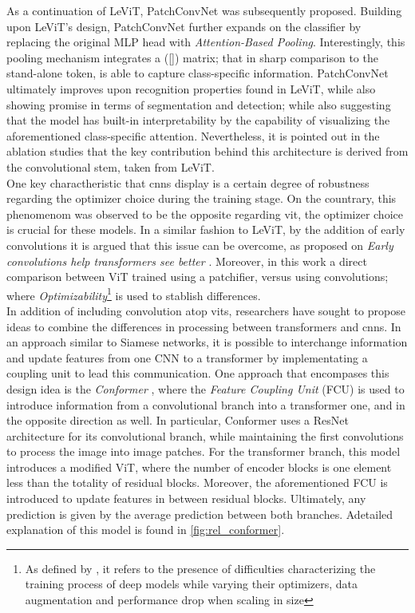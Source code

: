 As a continuation of LeViT, PatchConvNet \autocite{touvron2021augmenting} was subsequently 
proposed. Building upon LeViT's design, PatchConvNet further expands on the classifier by 
replacing the original MLP head with \emph{Attention-Based Pooling}. Interestingly, this 
pooling mechanism integrates a ([]) matrix; that in sharp comparison to the stand-alone 
token, is able to capture class-specific information. PatchConvNet ultimately improves upon 
recognition properties found in LeViT, while also showing promise in terms of segmentation and 
detection; while also suggesting that the model has built-in interpretability by the capability of 
visualizing the aforementioned class-specific attention. Nevertheless, it is pointed out in the 
ablation studies that the key contribution behind this architecture is derived from the 
convolutional stem, taken from LeViT.\\ 

\noindent One key charactheristic that \glspl{cnn} display is a certain degree of robustness 
regarding the optimizer choice during the training stage. On the countrary, this phenomenom was 
observed to be the opposite regarding \gls{vit}, the optimizer choice is crucial for these 
models. In a similar fashion to LeViT, by the addition of early convolutions it is argued that 
this issue can be overcome, as proposed on \emph{Early convolutions help transformers see 
better} \autocite{xiao2021early}. Moreover, in this work a direct comparison between ViT trained 
using a patchifier, versus using convolutions; where \emph{Optimizability}\footnote{As defined by 
\cite{xiao2021early}, it refers to the presence of difficulties characterizing the training 
process of deep models while varying their optimizers, data augmentation and performance drop 
when scaling in size} is used to stablish differences.\\



\noindent In addition of including convolution atop \glspl{vit}, researchers have sought to propose 
ideas to combine the differences in processing between transformers and \glspl{cnn}. In an 
approach similar to Siamese networks, it is possible to interchange information and update 
features from one CNN to a transformer by implementating a coupling unit to lead this 
communication. One approach that encompases this design idea is the \emph{Conformer} \autocite{
peng2021conformer}, where the \emph{Feature Coupling Unit} (FCU) is used to introduce information 
from a convolutional branch into a transformer one, and in the opposite direction as well. In 
particular, Conformer uses a ResNet architecture for its convolutional branch, while 
maintaining the first convolutions to process the image into image patches. For the transformer 
branch, this model introduces a modified ViT, where the number of encoder blocks is one element 
less than the totality of residual blocks. Moreover, the aforementioned FCU is introduced to update 
features in between residual blocks. Ultimately, any prediction is given by the average prediction 
between both branches. Adetailed explanation of this model is found in \autoref{fig:rel_conformer}.